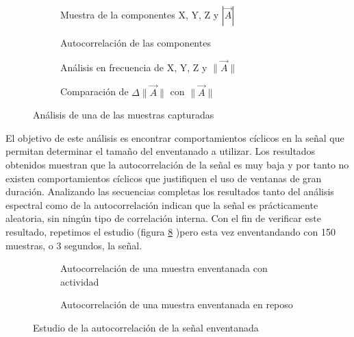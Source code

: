 \begin{figure}[htb!]
  \centering
  \begin{subfigure}[b]{0.48\textwidth}
      \centering
      \caption{Muestra de la componentes X, Y, Z y $|\vec{A}|$}
      \label{fig:dataset:xyzmodsample}
  \end{subfigure}
  \hfill
  \begin{subfigure}[b]{0.48\textwidth}
      \centering
      \caption{Autocorrelación de las componentes}
      \label{fig:dataset:autocorrsample}
  \end{subfigure}
  \begin{subfigure}[b]{0.48\textwidth}
    \centering
    \caption{Análisis en frecuencia de X, Y, Z y $\|\vec{A}\|$}
    \label{fig:dataset:fftsample} 
  \end{subfigure}
  \hfill
  \begin{subfigure}[b]{0.48\textwidth}
    \centering
    \caption{Comparación de $\Delta\|\vec{A}\|$ con $\|\vec{A}\|$}
    \label{fig:dataset:accelsample}
  \end{subfigure}
  \caption{\label{fig:dataset:samples} Análisis de una de las muestras capturadas}
\end{figure}

El objetivo de este análisis es encontrar comportamientos cíclicos en la señal que permitan determinar el tamaño del enventanado a utilizar. Los resultados obtenidos muestran que la autocorrelación de la señal es muy baja y por tanto no existen comportamientos cíclicos que justifiquen el uso de ventanas de gran duración. Analizando las secuencias completas los resultados tanto del análisis espectral como de la autocorrelación indican que la señal es prácticamente aleatoria, sin ningún tipo de correlación interna. Con el fin de verificar este resultado, repetimos el estudio (figura \ref{fig:dataset:sub:autocor} )pero esta vez enventandando con 150 muestras, o 3 segundos, la señal.

\begin{figure}[htb!]
  \centering
  \begin{subfigure}[b]{0.48\textwidth}
      \centering
      \caption{Autocorrelación de una muestra enventanada con actividad}
      \label{fig:dataset:sub:autocorlow}
  \end{subfigure}
  \hfill
  \begin{subfigure}[b]{0.48\textwidth}
      \centering
      \caption{Autocorrelación de una muestra enventanada en reposo}
      \label{fig:dataset:sub:autocorhigh}
  \end{subfigure}
  \caption{\label{fig:dataset:sub:autocor} Estudio de la autocorrelación de la señal enventanada}

\end{figure}

